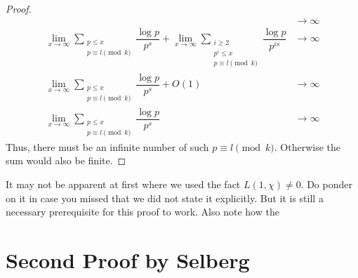 \documentclass[elemannt.tex]{subfile}
\begin{document}
\begin{proof}
\begin{align*}
						& \to\infty\\
					\lim_{x\to\infty}\sum_{\substack{p\leq x\\p\equiv l\pmod{k}}}\dfrac{\log{p}}{p^{s}}+\lim_{x\to\infty}\sum_{\substack{i\geq 2\\p^{i}\leq x\\p\equiv l\pmod{k}}}\dfrac{\log{p}}{p^{is}}
						& \to\infty\\
					\lim_{x\to\infty}\sum_{\substack{p\leq x\\p\equiv l\pmod{k}}}\dfrac{\log{p}}{p^{s}}+O(1)
						& \to\infty\\
					\lim_{x\to\infty}\sum_{\substack{p\leq x\\p\equiv l\pmod{k}}}\dfrac{\log{p}}{p^{s}}
						& \to\infty
				\end{align*}
			Thus, there must be an infinite number of such $p\equiv l\pmod{k}$. Otherwise the sum would also be finite.
		\end{proof}

		\begin{note}
			It may not be apparent at first where we used the fact $L(1, \chi)\neq0$. Do ponder on it in case you missed that we did not state it explicitly. But it is still a necessary prerequisite for this proof to work. Also note how the
		\end{note}
	\section{Second Proof by Selberg}
\end{document}
